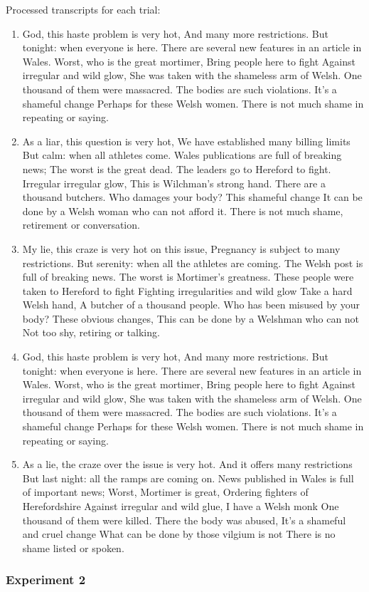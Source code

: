 \documentclass{article}
\begin{document}
Processed transcripts for each trial:

\begin{enumerate}
\item 
God, this haste problem is very hot,
And many more restrictions.
But tonight: when everyone is here.
There are several new features in an article in Wales.
Worst, who is the great mortimer,
Bring people here to fight
Against irregular and wild glow,
She was taken with the shameless arm of Welsh.
One thousand of them were massacred.
The bodies are such violations.
It's a shameful change
Perhaps for these Welsh women.
There is not much shame in repeating or saying.


\item 
As a liar, this question is very hot,
We have established many billing limits
But calm: when all athletes come.
Wales publications are full of breaking news;
The worst is the great dead.
The leaders go to Hereford to fight.
Irregular irregular glow,
This is Wilchman's strong hand.
There are a thousand butchers.
Who damages your body?
This shameful change
It can be done by a Welsh woman who can not afford it.
There is not much shame, retirement or conversation.



\item 
My lie, this craze is very hot on this issue,
Pregnancy is subject to many restrictions.
But serenity: when all the athletes are coming.
The Welsh post is full of breaking news.
The worst is Mortimer's greatness.
These people were taken to Hereford to fight
Fighting irregularities and wild glow
Take a hard Welsh hand,
A butcher of a thousand people.
Who has been misused by your body?
These obvious changes,
This can be done by a Welshman who can not
Not too shy, retiring or talking.


\item 
God, this haste problem is very hot,
And many more restrictions.
But tonight: when everyone is here.
There are several new features in an article in Wales.
Worst, who is the great mortimer,
Bring people here to fight
Against irregular and wild glow,
She was taken with the shameless arm of Welsh.
One thousand of them were massacred.
The bodies are such violations.
It's a shameful change
Perhaps for these Welsh women.
There is not much shame in repeating or saying.



\item 
As a lie, the craze over the issue is very hot.
And it offers many restrictions
But last night: all the ramps are coming on.
News published in Wales is full of important news;
Worst, Mortimer is great,
Ordering fighters of Herefordshire
Against irregular and wild glue,
I have a Welsh monk
One thousand of them were killed.
There the body was abused,
It's a shameful and cruel change
What can be done by those vilgium is not
There is no shame listed or spoken.

\end{enumerate}\subsubsection{Experiment 2}
\end{document}

